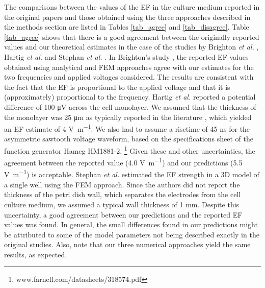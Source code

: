 The comparisons between the values of the \acs{EF} in the culture medium reported in the original papers and those obtained using the three approaches described in the methods section are listed in Tables \ref{tab_agree} and \ref{tab_disagree}. Table \ref{tab_agree} shows that there is a good agreement between the originally reported values and our theoretical estimates in the case of the studies by Brighton \textit{et al.} \cite{Brighton1992-gg}, Hartig \textit{et al.} \cite{Hartig2000-ny} and Stephan \textit{et al.} \cite{Stephan2020-qh}. In Brighton’s study \cite{Brighton1988-vc}, the reported \acs{EF} values obtained using analytical and \acs{FEM} approaches agree with our estimates for the two frequencies and applied voltages considered. The results are consistent with the fact that the \acs{EF} is proportional to the applied voltage and that it is (approximately) proportional to the frequency. Hartig \textit{et al.} reported a potential difference of 100 \si{\micro\volt} across the cell monolayer. We assumed that the thickness of the monolayer was 25 \si{\micro\meter} as typically reported in the literature \cite{Ge2014-mj}, which yielded an \acs{EF} estimate of 4 \si{\volt\per\meter}. We also had to assume a risetime of 45 \si{\nano\second} for the asymmetric sawtooth voltage waveform, based on the specifications sheet of the function generator Hameg HM1881-2. \footnote{www.farnell.com/datasheets/318574.pdf} Given these and other uncertainties, the agreement between the reported value (4.0 \si{\volt\per\meter}) and our predictions (5.5 \si{\volt\per\meter}) is acceptable. Stephan \textit{et al.} \cite{Stephan2020-qh} estimated the \acs{EF} strength in a 3D model of a single well using the \acs{FEM} approach. Since the authors did not report the thickness of the petri dish wall, which separates the electrodes from the cell culture medium, we assumed a typical wall thickness of 1 \si{\milli\meter}. Despite this uncertainty, a good agreement between our predictions and the reported \acs{EF} values was found. In general, the small differences found in our predictions might be attributed to some of the model parameters not being described exactly in the original studies. Also, note that our three numerical approaches yield the same results, as expected.



